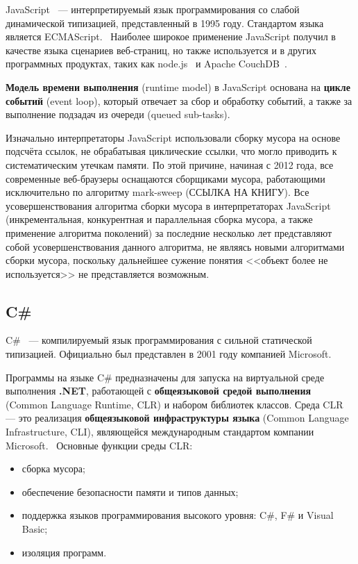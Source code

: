 JavaScript~\cite{js} --- интерпретируемый язык программирования со слабой динамической типизацией, представленный в 1995 году. Стандартом языка является ECMAScript.~\cite{ecmascript} Наиболее широкое применение JavaScript получил в качестве языка сценариев веб-страниц, но также используется и в других программных продуктах, таких как node.js~\cite{node_js} и Apache CouchDB~\cite{couchdb}.

\textbf{Модель времени выполнения} (runtime model) в JavaScript основана на \textbf{цикле событий} (event loop), который отвечает за сбор и обработку событий, а также за выполнение подзадач из очереди (queued sub-tasks).~\cite{js_event_loop}

Изначально интерпретаторы JavaScript использовали сборку мусора на основе подсчёта ссылок, не обрабатывая циклические ссылки, что могло приводить к систематическим утечкам памяти. По этой причине, начиная с 2012 года, все современные веб-браузеры оснащаются сборщиками мусора, работающими исключительно по алгоритму mark-sweep (ССЫЛКА НА КНИГУ). Все усовершенствования алгоритма сборки мусора в интерпретаторах JavaScript (инкрементальная, конкурентная и параллельная сборка мусора, а также применение алгоритма поколений) за последние несколько лет представляют собой усовершенствования данного алгоритма, не являясь новыми алгоритмами сборки мусора, поскольку дальнейшее сужение понятия <<объект более не используется>> не представляется возможным.~\cite{js_memory}

\subsection{C\#}

C\#~\cite{dotnet_tour} --- компилируемый язык программирования с сильной статической типизацией. Официально был представлен в 2001 году компанией Microsoft.

Программы на языке C\# предназначены для запуска на виртуальной среде выполнения \textbf{.NET}, работающей с \textbf{общеязыковой средой выполнения} (Common Language Runtime, CLR) и набором библиотек классов. Среда CLR --- это реализация \textbf{общеязыковой инфраструктуры языка} (Common Language Infrastructure, CLI), являющейся международным стандартом компании Microsoft.~\cite{dotnet_tour} Основные функции среды CLR:~\cite{dotnet_intro}~\cite{dotnet_clr_intro}

\begin{itemize}[label*=---]
	\item сборка мусора;
	\item обеспечение безопасности памяти и типов данных;
	\item поддержка языков программирования высокого уровня: C\#, F\# и Visual Basic;
	\item изоляция программ.
\end{itemize}

